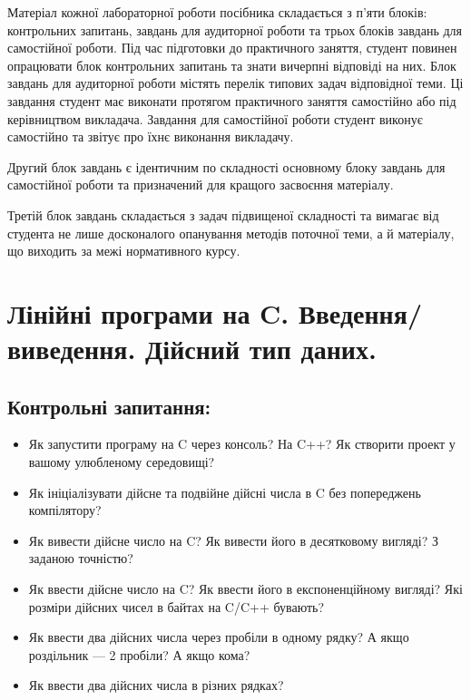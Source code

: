 \documentclass[a5paper,titlepage,openany,twoside,draft]{book_unv}%
\begin{document}
Матеріал кожної лабораторної роботи посібника складається з п'яти
блоків: контрольних запитань, завдань для аудиторної роботи та трьох
блоків завдань для самостійної роботи. Під час підготовки до практичного
заняття, студент повинен опрацювати блок контрольних запитань та знати
вичерпні відповіді на них. Блок завдань для аудиторної роботи містять перелік
типових задач відповідної теми. Ці завдання студент має виконати
протягом практичного заняття самостійно або під керівництвом викладача.
Завдання для самостійної роботи студент виконує самостійно та звітує про
їхнє виконання викладачу. 

Другий блок завдань є ідентичним по складності основному блоку завдань
для самостійної роботи та призначений для кращого засвоєння матеріалу.

Третій блок завдань складається з задач підвищеної складності та вимагає
від студента не лише досконалого опанування методів поточної теми, а й
матеріалу, що виходить за межі нормативного курсу.

\chapter{ Лінійні програми на C. Введення/виведення. Дійсний тип даних. }
%

\section{Контрольні запитання:}

\begin{itemize}
\item
Як запустити програму на C через консоль? На C++? Як створити
проект у вашому улюбленому середовищі?
\item
Як ініціалізувати дійсне та подвійне дійсні числа в C без попереджень
компілятору?

\item
Як вивести дійсне число на C? Як вивести його в десятковому вигляді?
З заданою точністю?

\item
Як ввести дійсне число на C? Як ввести його в
експоненційному вигляді? Які розміри дійсних чисел в байтах на C/C++
бувають?

\item
Як ввести два дійсних числа через пробіли в одному рядку? А якщо
роздільник --- 2 пробіли? А якщо кома?
\item
Як ввести два дійсних числа в різних рядках?

\end{itemize}
\end{document}
